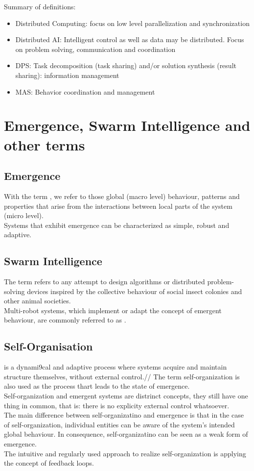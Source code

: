 \vfill
Summary of definitions:
\begin{itemize}
\item Distributed Computing: focus on low level parallelization and synchronization
\item Distributed AI: Intelligent control as well as data may be distributed. Focus on problem solving, communication and coordination
\item DPS: Task decomposition (task sharing) and/or solution synthesis (result sharing): information management
\item MAS: Behavior coordination and management
\end{itemize}
\newpage

\section{Emergence, Swarm Intelligence and other terms}
\subsection{Emergence}
With the term , we refer to those global (macro level) behaviour, patterns and properties that arise from the interactions between local parts of the system (micro level).\\
Systems that exhibit emergence can be characterized as simple, robust and adaptive.
\subsection{Swarm Intelligence}

The term  refers to any attempt to design algorithms or distributed problem-solving devices inspired by the collective behaviour of social insect colonies and other animal societies.\\
Multi-robot systems, which implement or adapt the concept of emergent behaviour, are commonly referred to as .
\subsection{Self-Organisation}
 is a dynami9cal and adaptive process where systems acquire and maintain structure themselves, without external control.//
The term self-organization is also used as the process thart leads to the state of emergence.\\
Self-organization and emergent systems are distrinct concepts, they still have one thing in common, that is: there is no explicity external control whatsoever.\\
The main difference between self-organizatino and emergence is that in the case of self-organization, individual entities can be aware of the system's intended global behaviour. In consequence, self-organizatino can be seen as a weak form of emergence.\\
The intuitive and regularly used approach to realize self-organization is applying the concept of feedback loops.

